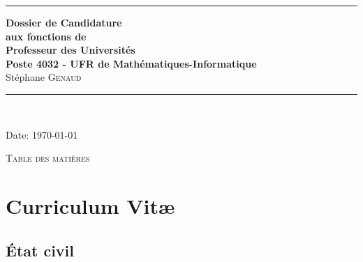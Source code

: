 \documentclass[11pt]{article}
\begin{document}
\thispagestyle{empty}




\rule{\linewidth}{1mm}
\begin{center}
\Large{\textbf{Dossier de Candidature\\
aux fonctions de \\
Professeur des Universités\\
Poste 4032 - UFR de Mathématiques-Informatique}}\\[5mm]
\Large{Stéphane \textsc{Genaud}}\\[1cm]

\rule{\linewidth}{1mm}
\\
\vspace{3cm}
\end{center}
\begin{center}
Date: \today\\
\end{center}

\newpage
\mbox{}%

\setlength{\parindent}{5mm} %
\setlength{\parindent}{0mm}
\newpage


\begin{center}
\huge{\textsc{Table des matières}}
\end{center}
\vspace{2cm}


\tableofcontents

\noindent


\newpage



\section{Curriculum Vit{\ae}}

\setlength{\tabcolsep}{5pt}

\subsection{\'Etat civil}

\medskip
\end{document}
